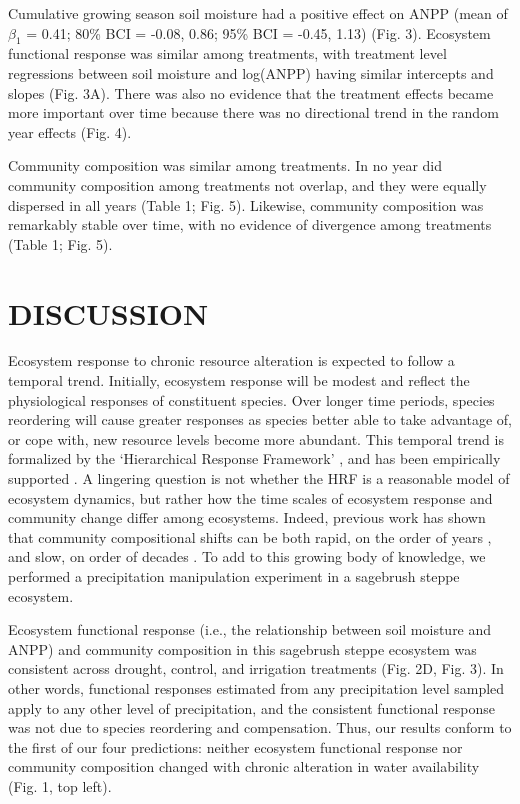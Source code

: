 \documentclass[fleqn,10pt,lineno]{wlpeerj} %
\begin{document}
Cumulative growing season soil moisture had a positive effect on ANPP
(mean of \(\beta_{1}\) = 0.41; 80\% BCI = -0.08, 0.86; 95\% BCI = -0.45,
1.13) (Fig. 3). Ecosystem functional response was similar among
treatments, with treatment level regressions between soil moisture and
log(ANPP) having similar intercepts and slopes (Fig. 3A). There was also
no evidence that the treatment effects became more important over time
because there was no directional trend in the random year effects (Fig.
4).

Community composition was similar among treatments. In no year did
community composition among treatments not overlap, and they were
equally dispersed in all years (Table 1; Fig. 5). Likewise, community
composition was remarkably stable over time, with no evidence of
divergence among treatments (Table 1; Fig. 5).

\section{DISCUSSION}\label{discussion}

Ecosystem response to chronic resource alteration is expected to follow
a temporal trend. Initially, ecosystem response will be modest and
reflect the physiological responses of constituent species. Over longer
time periods, species reordering will cause greater responses as species
better able to take advantage of, or cope with, new resource levels
become more abundant. This temporal trend is formalized by the
`Hierarchical Response Framework' \citep[HRF,][]{Smith2009}, and has
been empirically supported \citep{Knapp2012, Wilcox2016}. A lingering
question is not whether the HRF is a reasonable model of ecosystem
dynamics, but rather how the time scales of ecosystem response and
community change differ among ecosystems. Indeed, previous work has
shown that community compositional shifts can be both rapid, on the
order of years \citep{Hoover2014}, and slow, on order of decades
\citep{Knapp2012, Wilcox2016}. To add to this growing body of knowledge,
we performed a precipitation manipulation experiment in a sagebrush
steppe ecosystem.

Ecosystem functional response (i.e., the relationship between soil
moisture and ANPP) and community composition in this sagebrush steppe
ecosystem was consistent across drought, control, and irrigation
treatments (Fig. 2D, Fig. 3). In other words, functional responses
estimated from any precipitation level sampled apply to any other level
of precipitation, and the consistent functional response was not due to
species reordering and compensation. Thus, our results conform to the
first of our four predictions: neither ecosystem functional response nor
community composition changed with chronic alteration in water
availability (Fig. 1, top left).
\end{document}
